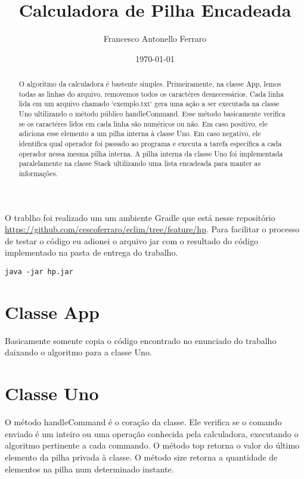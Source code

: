 \documentclass[11pt]{article}
\author{Francesco Antonello Ferraro}
\date{\today}
\title{Calculadora de Pilha Encadeada}
\begin{document}
\maketitle
\begin{abstract}

 O algoritmo da calculadora é bastente simples. Primeiramente, na classe App, lemos todas as linhas do arquivo, removemos todos os caractéres desnecessários. Cada linha lida em um arquivo chamado `exemplo.txt` gera uma ação a ser executada na classe Uno ultilizando o método público handleCommand. 
Esse método basicamente verifica se os caractéres lidos em cada linha são numéricos ou não. Em caso positivo, ele adiciona esse elemento a um pilha interna à classe Uno. Em caso negativo, ele identifica qual operador foi passado ao programa e executa a tarefa específica a cada operador nessa mesma pilha interna. A pilha interna da classe Uno foi implementada paralelamente na classe Stack ultilizando uma lista encadeada para manter as informações.

\end{abstract}




O trablho foi realizado um um ambiente Gradle que está nesse
repositório
\href{https://github.com/cescoferraro/eclim/tree/feature/hp}{https://github.com/cescoferraro/eclim/tree/feature/hp}. Para facilitar
o processo de testar o código eu adionei o arquivo jar com o resultado
do código implementado na pasta de entrega do trabalho.

\begin{verbatim}
java -jar hp.jar
\end{verbatim}

\section{Classe App}
\label{sec:orgafb0690}


Basicamente somente copia o código encontrado no enunciado do trabalho
daixando o algoritmo para a classe Uno.

\section{Classe Uno}
\label{sec:org801dbdf}

O método handleCommand é o coração da classe. Ele verifica se o
comando enviado é um inteiro ou uma operação conhecida pela
calculadora, executando o algoritmo pertinente a cada commando.
O método top retorna o valor do último elemento da pilha privada à
classe.  O método size retorna a quantidade de elementos na pilha
num determinado instante.
\end{document}
